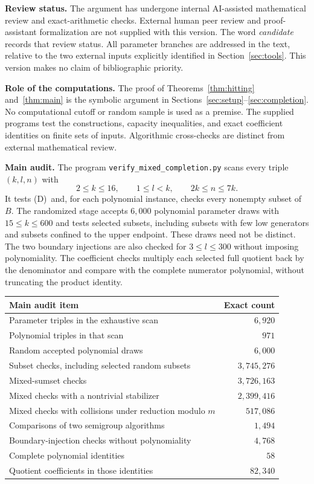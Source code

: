 \documentclass[11pt,a4paper]{article}
\numberwithin{equation}{section}
\theoremstyle{remark}
\newcommand{\Dcond}{\textup{(D)}}
\newcommand{\code}[1]{\texttt{\small #1}}
\begin{document}
\textbf{Review status.}
The argument has undergone internal AI-assisted mathematical review
and exact-arithmetic checks. External human peer review and
proof-assistant formalization are not supplied with this version.
The word \emph{candidate} records that review status.
All parameter branches are addressed in the text, relative to the two
external inputs explicitly identified in Section~\ref{sec:tools}.
This version makes no claim of bibliographic priority.

\textbf{Role of the computations.}
The proof of Theorems~\ref{thm:hitting} and~\ref{thm:main} is the
symbolic argument in Sections~\ref{sec:setup}--\ref{sec:completion}.
No computational cutoff or random sample is used as a premise.
The supplied programs test the constructions, capacity inequalities,
and exact coefficient identities on finite sets of inputs.
Algorithmic cross-checks are distinct from external mathematical review.

\textbf{Main audit.}
The program \code{verify\_mixed\_completion.py} scans every triple
$(k,l,n)$ with
\[
  2\le k\le16,\qquad 1\le l<k,\qquad 2k\le n\le7k.
\]
It tests \Dcond\ and, for each polynomial instance, checks every
nonempty subset of $B$.
The randomized stage accepts $6{,}000$ polynomial parameter draws
with $15\le k\le600$ and tests selected subsets, including subsets
with few low generators and subsets confined to the upper endpoint.
These draws need not be distinct.
The two boundary injections are also checked for $3\le l\le300$
without imposing polynomiality.
The coefficient checks multiply each selected full quotient back by
the denominator and compare with the complete numerator polynomial,
without truncating the product identity.

\begin{center}
\small
\begin{tabularx}{\textwidth}{@{}Xr@{}}
\toprule
\textbf{Main audit item} & \textbf{Exact count}\\
\midrule
Parameter triples in the exhaustive scan & $6{,}920$\\
Polynomial triples in that scan & $971$\\
Random accepted polynomial draws & $6{,}000$\\
Subset checks, including selected random subsets & $3{,}745{,}276$\\
Mixed-sumset checks & $3{,}726{,}163$\\
Mixed checks with a nontrivial stabilizer & $2{,}399{,}416$\\
Mixed checks with collisions under reduction modulo $m$ & $517{,}086$\\
Comparisons of two semigroup algorithms & $1{,}494$\\
Boundary-injection checks without polynomiality & $4{,}768$\\
Complete polynomial identities & $58$\\
Quotient coefficients in those identities & $82{,}340$\\
\bottomrule
\end{tabularx}
\end{center}
\end{document}
